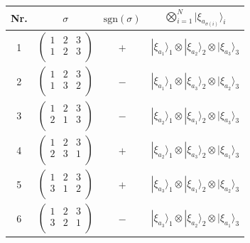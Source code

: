 \documentclass[9pt]{report}
\begin{document}
\begin{table}[H]
	\begin{center}
		\begin{tabular}{cccc}
			\hline
			Nr.  &  $\sigma$  &  $\mathrm{sgn}(\sigma)$  &  $\displaystyle\bigotimes_{i=1}^{N}\big|\xi_{a_{\sigma(i)}}\big\rangle_i $
			\\ \hline\hline
			1  &
			$\left(\begin{array}{ccc}1  &  2  &  3  \\ 1  &  2  &  3  \\\end{array}\right)$  &
			$+$  &
			$|\xi_{a_1}\rangle_1\otimes|\xi_{a_2}\rangle_2\otimes|\xi_{a_3}\rangle_3$
			\\
			2  &
			$\left(\begin{array}{ccc}1  &  2  &  3  \\ 1  &  3  &  2  \\\end{array}\right)$  &
			$-$  &
			$|\xi_{a_1}\rangle_1\otimes|\xi_{a_3}\rangle_2\otimes|\xi_{a_2}\rangle_3$
			\\
			3  &
			$\left(\begin{array}{ccc}1  &  2  &  3  \\ 2  &  1  &  3  \\\end{array}\right)$  &
			$-$  &
			$|\xi_{a_2}\rangle_1\otimes|\xi_{a_1}\rangle_2\otimes|\xi_{a_3}\rangle_3$
			\\
			4  &
			$\left(\begin{array}{ccc}1  &  2  &  3  \\ 2  &  3  &  1  \\\end{array}\right)$  &
			$+$  &
			$|\xi_{a_2}\rangle_1\otimes|\xi_{a_3}\rangle_2\otimes|\xi_{a_1}\rangle_3$
			\\
			5  &
			$\left(\begin{array}{ccc}1  &  2  &  3  \\ 3  &  1  &  2  \\\end{array}\right)$  &
			$+$  &
			$|\xi_{a_3}\rangle_1\otimes|\xi_{a_1}\rangle_2\otimes|\xi_{a_2}\rangle_3$
			\\
			6  &
			$\left(\begin{array}{ccc}1  &  2  &  3  \\ 3  &  2  &  1  \\\end{array}\right)$  &
			$-$  &
			$|\xi_{a_3}\rangle_1\otimes|\xi_{a_2}\rangle_2\otimes|\xi_{a_1}\rangle_3$
			\\\hline
		\end{tabular}
	\end{center}
\end{table}
\end{document}
